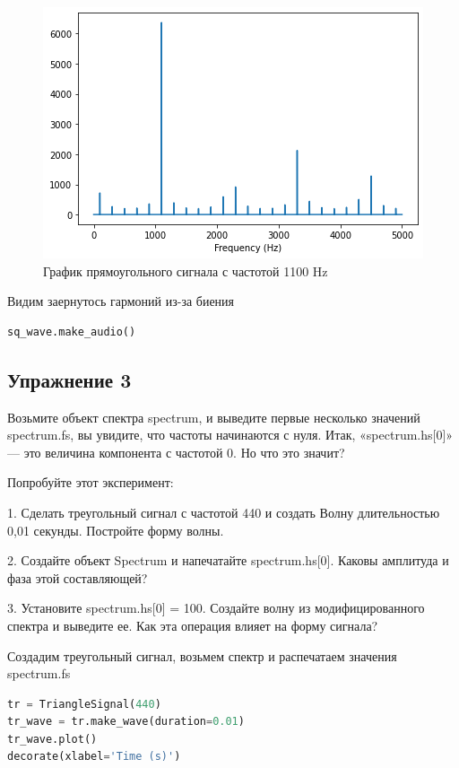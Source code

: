 \begin{figure}[H]
	\begin{center}
		\includegraphics[scale=1]{fig/lab02/lab02_07.png}
		\caption{График прямоугольного сигнала с частотой 1100 Hz}
	\end{center}
\end{figure}

Видим заернутось гармоний из-за биения
\begin{lstlisting}[language=Python]
sq_wave.make_audio()
\end{lstlisting}


\subsection{Упражнение 3}

Возьмите объект спектра spectrum, и выведите первые несколько значений spectrum.fs, вы увидите, что частоты начинаются с нуля. Итак, «spectrum.hs[0]» — это величина компонента с частотой 0. Но что это значит?

\noindent Попробуйте этот эксперимент:

1. Сделать треугольный сигнал с частотой 440 и создать Волну длительностью 0,01 секунды. Постройте форму волны.

2. Создайте объект Spectrum и напечатайте spectrum.hs[0]. Каковы амплитуда и фаза этой составляющей?

3. Установите spectrum.hs[0] = 100. Создайте волну из модифицированного спектра и выведите ее. Как эта операция влияет на форму сигнала?

Создадим треугольный сигнал, возьмем спектр и распечатаем значения spectrum.fs

\begin{lstlisting}[language=Python]
tr = TriangleSignal(440)
tr_wave = tr.make_wave(duration=0.01)
tr_wave.plot()
decorate(xlabel='Time (s)')
\end{lstlisting}

